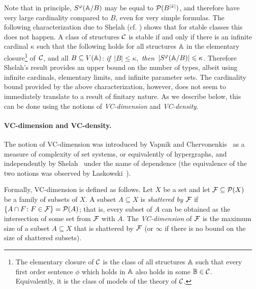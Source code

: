 Note that in principle, $S^\phi(\str A/B)$
may be equal to $\Pow(B^{|\bar x|})$, and therefore have very large cardinality compared to $B$, even for very simple formulas. 
The following characterization due to Shelah 
(cf. \cite[Theorem 2.2, Chapter II]{shelah1990classification})
shows that for stable classes this does not happen.
A class of structures $\cal C$
	is stable if and only if 
	there is 
	an infinite cardinal $\kappa$
	such that the following holds for all
	structures
	$\str A$ in the elementary closure\footnote{The elementary closure of $\cal C$ is 
	the class of all structures $\str A$
	such that  every first order sentence $\phi$
	which holds in $\str A$ also holds in some $\str B\in \cal C$. Equivalently, it is the class of 
   models of the theory of $\cal C$.} of~$\cal C$, and 
   all $B\subset V(\str A)$:
\mbox{\textit{if} $|B|\le \kappa$, \textit{then} $
|S^\phi(\str A/B)|\le \kappa$.}
Therefore
Shelah's result provides an upper bound on the number of types, albeit using infinite cardinals, elementary limits, and infinite parameter sets.
 The cardinality bound provided by the above characterization, %
 however, does not seem to  immediately translate to a result of finitary nature. As we describe below,
 this can be done using the notions of {\em{VC-dimension}} and {\em{VC-density}}.

\paragraph{VC-dimension and VC-density.} The notion of VC-di\-men\-sion was introduced by 
Vapnik and Chervonenkis~\cite{chervonenkis1971theory} 
as a measure of complexity of set systems, or equivalently of 
hypergraphs, and independently by Shelah~\cite{shelah1971stability} 
under the name of dependence (the equivalence of the two notions
was observed by Laskowski~\cite{laskowski1992vapnik}).

Formally, VC-dimension is defined as follows. 
Let $X$ be a set and let  $\FFF\subseteq \Pow(X)$ 
be a family of subsets of $X$.
A subset $A\subseteq X$ is \emph{shattered by $\FFF$} if
$\{A\cap F\colon F\in \FFF\}=\Pow(A)$; that is, every subset of $A$ can be obtained as the intersection of some set from $\FFF$ with $A$. 
The \emph{VC-dimension}
of $\FFF$ is the maximum size of a subset $A\subseteq X$ that is shattered by
$\FFF$ (or $\infty$ if there is no bound on the size of shattered subsets).

